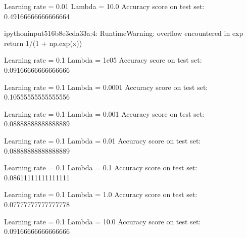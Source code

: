 \documentclass[letterpaper,10pt,english]{sphinxmanual}
\begin{document}
\begin{sphinxVerbatim}[commandchars=\\\{\}]
Learning rate  =  0.01
Lambda =  10.0
Accuracy score on test set:  0.49166666666666664
\end{sphinxVerbatim}

\begin{sphinxVerbatim}[commandchars=\\\{\}]
\PYGZlt{}ipython\PYGZhy{}input\PYGZhy{}5\PYGZhy{}16b8e3cda33a\PYGZgt{}:4: RuntimeWarning: overflow encountered in exp
  return 1/(1 + np.exp(\PYGZhy{}x))
\end{sphinxVerbatim}

\begin{sphinxVerbatim}[commandchars=\\\{\}]
Learning rate  =  0.1
Lambda =  1e\PYGZhy{}05
Accuracy score on test set:  0.09166666666666666
\end{sphinxVerbatim}

\begin{sphinxVerbatim}[commandchars=\\\{\}]
Learning rate  =  0.1
Lambda =  0.0001
Accuracy score on test set:  0.10555555555555556
\end{sphinxVerbatim}

\begin{sphinxVerbatim}[commandchars=\\\{\}]
Learning rate  =  0.1
Lambda =  0.001
Accuracy score on test set:  0.08888888888888889
\end{sphinxVerbatim}

\begin{sphinxVerbatim}[commandchars=\\\{\}]
Learning rate  =  0.1
Lambda =  0.01
Accuracy score on test set:  0.08888888888888889
\end{sphinxVerbatim}

\begin{sphinxVerbatim}[commandchars=\\\{\}]
Learning rate  =  0.1
Lambda =  0.1
Accuracy score on test set:  0.08611111111111111
\end{sphinxVerbatim}

\begin{sphinxVerbatim}[commandchars=\\\{\}]
Learning rate  =  0.1
Lambda =  1.0
Accuracy score on test set:  0.07777777777777778
\end{sphinxVerbatim}

\begin{sphinxVerbatim}[commandchars=\\\{\}]
Learning rate  =  0.1
Lambda =  10.0
Accuracy score on test set:  0.09166666666666666
\end{sphinxVerbatim}
\end{document}

